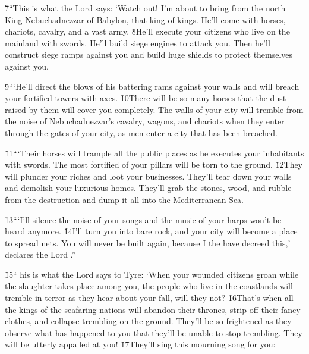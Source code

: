 \v{7}``This is what the Lord  says: `Watch out! I'm about to bring from the north King Nebuchadnezzar of Babylon, that king of kings. He'll come with horses, chariots, cavalry, and a vast army. \v{8}He'll execute your citizens who live on the mainland with swords. He'll build siege engines to attack you. Then he'll construct siege ramps against you and build huge shields to protect themselves against you.

\v{9}```He'll direct the blows of his battering rams against your walls and will breach your fortified towers with axes. \v{10}There will be so many horses that the dust raised by them will cover you completely. The walls of your city will tremble from the noise of Nebuchadnezzar's cavalry, wagons, and chariots when they enter through the gates of your city, as men enter a city that has been breached.

\v{11}```Their horses will trample all the public places as he executes your inhabitants with swords. The most fortified of your pillars will be torn to the ground. \v{12}They will plunder your riches and loot your businesses. They'll tear down your walls and demolish your luxurious homes. They'll grab the stones, wood, and rubble from the destruction and dump it all into the Mediterranean Sea.

\v{13}```I'll silence the noise of your songs and the music of your harps won't be heard anymore. \v{14}I'll turn you into bare rock, and your city will become a place to spread nets. You will never be built again, because I the  have decreed this,' declares the Lord .''

\v{15}`` his is what the Lord  says to Tyre: `When your wounded citizens groan while the slaughter takes place among you, the people who live in the coastlands will tremble in terror as they hear about your fall, will they not? \v{16}That's when all the kings of the seafaring nations will abandon their thrones, strip off their fancy clothes, and collapse trembling on the ground. They'll be so frightened as they observe what has happened to you that they'll be unable to stop trembling. They will be utterly appalled at you! \v{17}They'll sing this mourning song for you:

